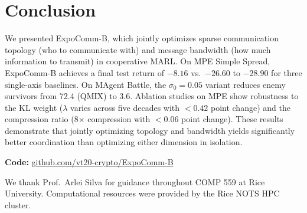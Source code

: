\documentclass{article}
\begin{document}
\section{Conclusion}
\label{sec:conclusion}

We presented ExpoComm-B, which jointly optimizes sparse communication topology (who to communicate with) and message bandwidth (how much information to transmit) in cooperative MARL. On MPE Simple Spread, ExpoComm-B achieves a final test return of $-8.16$ vs.\ $-26.60$ to $-28.90$ for three single-axis baselines. On MAgent Battle, the $\sigma_0=0.05$ variant reduces enemy survivors from 72.4 (QMIX) to 3.6. Ablation studies on MPE show robustness to the KL weight ($\lambda$ varies across five decades with $<0.42$ point change) and the compression ratio (8$\times$ compression with $<0.06$ point change). These results demonstrate that jointly optimizing topology and bandwidth yields significantly better coordination than optimizing either dimension in isolation.

\smallskip
\noindent\textbf{Code:} \href{https://github.com/vt20-crypto/ExpoComm-B}{github.com/vt20-crypto/ExpoComm-B}

\begin{ack}
We thank Prof.\ Arlei Silva for guidance throughout COMP 559 at Rice University. Computational resources were provided by the Rice NOTS HPC cluster.
\end{ack}
\end{document}
